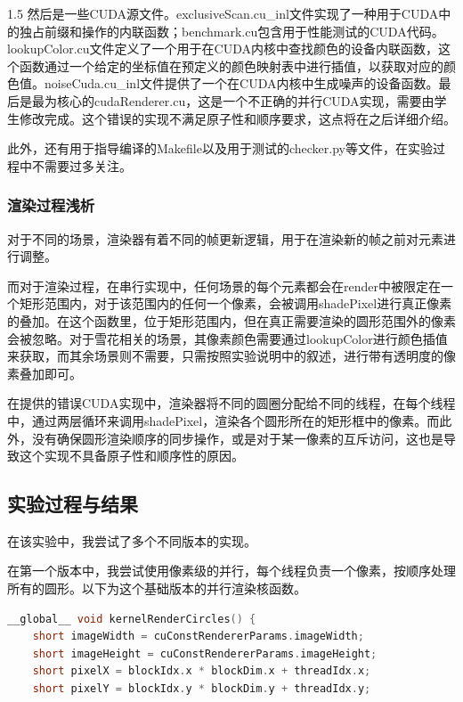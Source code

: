\documentclass[zihao=-4]{ctexart}
\begin{document}
\begin{spacing}{1.5}
然后是一些CUDA源文件。exclusiveScan.cu\_inl文件实现了一种用于CUDA中的独占前缀和操作的内联函数；benchmark.cu包含用于性能测试的CUDA代码。lookupColor.cu文件定义了一个用于在CUDA内核中查找颜色的设备内联函数，这个函数通过一个给定的坐标值在预定义的颜色映射表中进行插值，以获取对应的颜色值。noiseCuda.cu\_inl文件提供了一个在CUDA内核中生成噪声的设备函数。最后是最为核心的cudaRenderer.cu，这是一个不正确的并行CUDA实现，需要由学生修改完成。这个错误的实现不满足原子性和顺序要求，这点将在之后详细介绍。

此外，还有用于指导编译的Makefile以及用于测试的checker.py等文件，在实验过程中不需要过多关注。

\subsubsection{渲染过程浅析}

对于不同的场景，渲染器有着不同的帧更新逻辑，用于在渲染新的帧之前对元素进行调整。

而对于渲染过程，在串行实现中，任何场景的每个元素都会在render中被限定在一个矩形范围内，对于该范围内的任何一个像素，会被调用shadePixel进行真正像素的叠加。在这个函数里，位于矩形范围内，但在真正需要渲染的圆形范围外的像素会被忽略。对于雪花相关的场景，其像素颜色需要通过lookupColor进行颜色插值来获取，而其余场景则不需要，只需按照实验说明中的叙述，进行带有透明度的像素叠加即可。

在提供的错误CUDA实现中，渲染器将不同的圆圈分配给不同的线程，在每个线程中，通过两层循环来调用shadePixel，渲染各个圆形所在的矩形框中的像素。而此外，没有确保圆形渲染顺序的同步操作，或是对于某一像素的互斥访问，这也是导致这个实现不具备原子性和顺序性的原因。

\subsection{实验过程与结果}

在该实验中，我尝试了多个不同版本的实现。

在第一个版本中，我尝试使用像素级的并行，每个线程负责一个像素，按顺序处理所有的圆形。以下为这个基础版本的并行渲染核函数。

\begin{lstlisting}[language=C++,title={基础并行渲染核函数}]
__global__ void kernelRenderCircles() {
    short imageWidth = cuConstRendererParams.imageWidth;
    short imageHeight = cuConstRendererParams.imageHeight;
    short pixelX = blockIdx.x * blockDim.x + threadIdx.x;
    short pixelY = blockIdx.y * blockDim.y + threadIdx.y;


\end{lstlisting}
\end{spacing}
\end{document}

